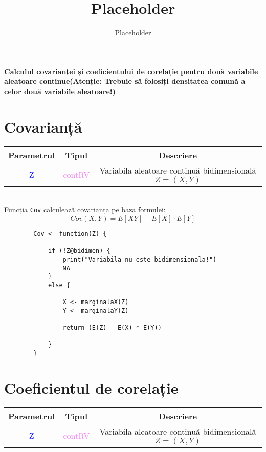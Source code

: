 \documentclass[12pt]{article}
\title{Placeholder}
\author{Placeholder}
\begin{document}
	\textbf{Calculul covarianței și coeficientului de corelație pentru două variabile aleatoare
		continue(Atenție: Trebuie să folosiți densitatea comună a celor două variabile
		aleatoare!)
}\vspace{5mm}
	
	\section*{Covarianță}
	\begin{center}
		\begin{tabular}{|| c | c | c ||}
			\hline
			Parametrul & Tipul & Descriere \\
			\hline
			\textcolor{blue}{Z} & \textcolor{violet}{contRV} & Variabila aleatoare continuă bidimensională $Z = (X, Y)$ \\
			
			\hline
		\end{tabular}
	\end{center}\hfill \\

	Funcția \texttt{Cov} calculează covarianța pe baza formulei:
	\begin{equation*}
		Cov(X, Y) = E[XY] - E[X] \cdot E[Y]
	\end{equation*}

	\begin{lstlisting}
		Cov <- function(Z) {
			
			if (!Z@bidimen) {
				print("Variabila nu este bidimensionala!")
				NA
			}
			else {
				
				X <- marginalaX(Z)
				Y <- marginalaY(Z)
				
				return (E(Z) - E(X) * E(Y))
				
			}
		}
	\end{lstlisting}

	\section*{Coeficientul de corelație}
	\begin{center}
		\begin{tabular}{|| c | c | c ||}
			\hline
			Parametrul & Tipul & Descriere \\
			\hline
			\textcolor{blue}{Z} & \textcolor{violet}{contRV} & Variabila aleatoare continuă bidimensională $Z = (X, Y)$ \\
			
			\hline
		\end{tabular}
	\end{center}\hfill \\
	
\end{document}
